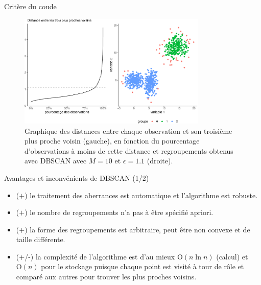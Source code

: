 \documentclass[
  ignorenonframetext,
]{beamer}
\providecommand{\tightlist}{%
  \setlength{\itemsep}{0pt}\setlength{\parskip}{0pt}}\usepackage{longtable,booktabs,array}
\begin{document}
\begin{frame}{Critère du coude}
\protect\hypertarget{crituxe8re-du-coude}{}
\begin{figure}

{\centering \includegraphics[width=0.8\textwidth,height=\textheight]{MATH60602-diapos12_files/figure-beamer/fig-dbscan2-1.pdf}

}

\caption{\label{fig-dbscan2}Graphique des distances entre chaque
observation et son troisième plus proche voisin (gauche), en fonction du
pourcentage d'observations à moins de cette distance et regroupements
obtenus avec DBSCAN avec \(M=10\) et \(\epsilon=1.1\) (droite).}

\end{figure}
\end{frame}

\begin{frame}{Avantages et inconvénients de DBSCAN (1/2)}
\protect\hypertarget{avantages-et-inconvuxe9nients-de-dbscan-12}{}
\begin{itemize}
\tightlist
\item
  (\(+\)) le traitement des aberrances est automatique et l'algorithme
  est robuste.
\item
  (\(+\)) le nombre de regroupements n'a pas à être spécifié apriori.
\item
  (\(+\)) la forme des regroupements est arbitraire, peut être non
  convexe et de taille différente.
\item
  (+/-) la complexité de l'algorithme est d'au mieux
  \(\mathrm{O}(n\ln n)\) (calcul) et \(\mathrm{O}(n)\) pour le stockage
  puisque chaque point est visité à tour de rôle et comparé aux autres
  pour trouver les plus proches voisins.
\end{itemize}
\end{frame}
\end{document}
